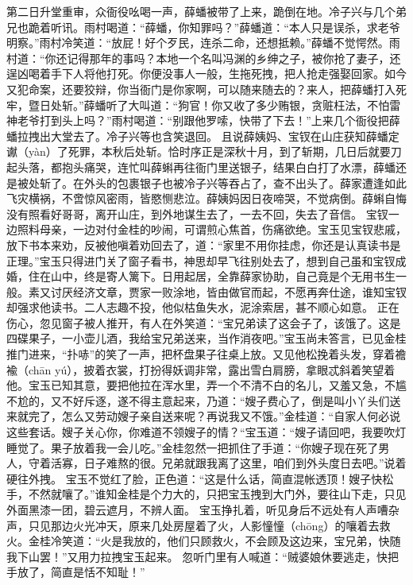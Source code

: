 \documentclass[12pt,oneside]{book}
\begin{document}
第二日升堂重审，众衙役吆喝一声，薛蟠被带了上来，跪倒在地。冷子兴与几个弟兄也跪着听讯。雨村喝道：“薛蟠，你知罪吗？”薛蟠道：“本人只是误杀，求老爷明察。”雨村冷笑道：“放屁！好个歹民，连杀二命，还想抵赖。”薛蟠不觉愕然。雨村道：“你还记得那年的事吗？本地一个名叫冯渊的乡绅之子，被你抢了妻子，还逞凶喝着手下人将他打死。你便没事人一般，生拖死拽，把人抢走强娶回家。如今又犯命案，还要狡辩，你当衙门是你家啊，可以随来随去的？来人，把薛蟠打入死牢，暨日处斩。”薛蟠听了大叫道：“狗官！你又收了多少贿银，贪赃枉法，不怕雷神老爷打到头上吗？”雨村喝道：“别跟他罗嗦，快带了下去！”上来几个衙役把薛蟠拉拽出大堂去了。冷子兴等也含笑退回。
且说薛姨妈、宝钗在山庄获知薛蟠定谳（yàn）了死罪，本秋后处斩。恰时序正是深秋十月，到了斩期，几日后就要刀起头落，都抱头痛哭，连忙叫薛蝌再往衙门里送银子，结果白白打了水漂，薛蟠还是被处斩了。在外头的包裹银子也被冷子兴等吞占了，查不出头了。薛家遭逢如此飞灾横祸，不啻惊风密雨，皆愍恻悲泣。薛姨妈因日夜啼哭，不觉病倒。薛蝌自悔没有照看好哥哥，离开山庄，到外地谋生去了，一去不回，失去了音信。
宝钗一边照料母亲，一边对付金桂的吵闹，可谓煎心焦首，伤痛欲绝。宝玉见宝钗悲戚，放下书本来劝，反被他嗔着劝回去了，道：“家里不用你挂虑，你还是认真读书是正理。”宝玉只得进门关了窗子看书，神思却早飞往别处去了，想到自己虽和宝钗成婚，住在山中，终是寄人篱下。日用起居，全靠薛家协助，自己竟是个无用书生一般。素又讨厌经济文章，贾家一败涂地，皆由做官而起，不愿再奔仕途，谁知宝钗却强求他读书。二人志趣不投，他似枯鱼失水，泥涂索居，甚不顺心如意。
正在伤心，忽见窗子被人推开，有人在外笑道：“宝兄弟读了这会子了，该饿了。这是四碟果子，一小壶儿酒，我给宝兄弟送来，当作消夜吧。”宝玉尚未答言，已见金桂推门进来，“扑哧”的笑了一声，把杯盘果子往桌上放。又见他松挽着头发，穿着襜褕（chān yú），披着衣裳，打扮得妖调非常，露出雪白肩膀，拿眼忒斜着笑望着他。宝玉已知其意，要把他拉在浑水里，弄一个不清不白的名儿，又羞又急，不尴不尬的，又不好斥逐，遂不得主意起来，乃道：“嫂子费心了，倒是叫小丫头们送来就完了，怎么又劳动嫂子亲自送来呢？再说我又不饿。”金桂道：“自家人何必说这些套话。嫂子关心你，你难道不领嫂子的情？“宝玉道：“嫂子请回吧，我要吹灯睡觉了。果子放着我一会儿吃。”金桂忽然一把抓住了手道：“你嫂子现在死了男人，守着活寡，日子难熬的很。兄弟就跟我离了这里，咱们到外头度日去吧。”说着硬往外拽。
宝玉不觉红了脸，正色道：“这是什么话，简直混帐透顶！嫂子快松手，不然就嚷了。”谁知金桂是个力大的，只把宝玉拽到大门外，要往山下走，只见外面黑漆一团，碧云遮月，不辨人面。
宝玉挣扎着，听见身后不远处有人声嘈杂声，只见那边火光冲天，原来几处房屋着了火，人影憧憧（chōng）的嚷着去救火。金桂冷笑道：“火是我放的，他们只顾救火，不会顾及这边来，宝兄弟，快随我下山罢！”又用力拉拽宝玉起来。
忽听门里有人喊道：“贼婆娘休要逃走，快把手放了，简直是恬不知耻！”
\end{document}

